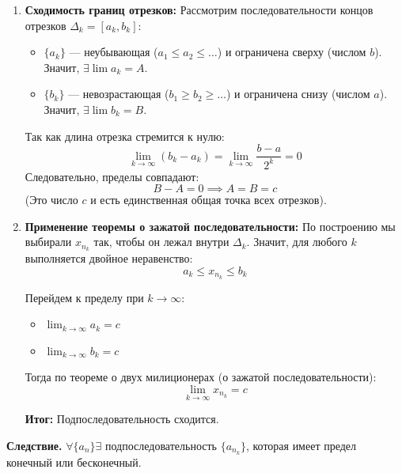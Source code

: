 \begin{tcolorbox}[title=Доказательство (через вложенные отрезки)]
\begin{enumerate}
		\item \textbf{Сходимость границ отрезков:}
		Рассмотрим последовательности концов отрезков $\Delta_k = [a_k, b_k]$:
		\begin{itemize}
			\item $\{a_k\}$ — неубывающая ($a_1 \le a_2 \le \dots$) и ограничена сверху (числом $b$). Значит, $\exists \lim a_k = A$.
			\item $\{b_k\}$ — невозрастающая ($b_1 \ge b_2 \ge \dots$) и ограничена снизу (числом $a$). Значит, $\exists \lim b_k = B$.
		\end{itemize}
		Так как длина отрезка стремится к нулю:
		$$ \lim_{k\to\infty} (b_k - a_k) = \lim_{k\to\infty} \frac{b-a}{2^k} = 0 $$
		Следовательно, пределы совпадают:
		$$ B - A = 0 \implies A = B = c $$
		(Это число $c$ и есть единственная общая точка всех отрезков).

		\item \textbf{Применение теоремы о зажатой последовательности:}
		По построению мы выбирали $x_{n_k}$ так, чтобы он лежал внутри $\Delta_k$. Значит, для любого $k$ выполняется двойное неравенство:
		$$ a_k \le x_{n_k} \le b_k $$
		
		Перейдем к пределу при $k \to \infty$:
		\begin{itemize}
			\item $\lim_{k\to\infty} a_k = c$
			\item $\lim_{k\to\infty} b_k = c$
		\end{itemize}
		
		Тогда по теореме о двух милиционерах (о зажатой последовательности):
		$$ \lim_{k\to\infty} x_{n_k} = c $$
		
		\textbf{Итог:} Подпоследовательность сходится.
	\end{enumerate}
\end{tcolorbox}

\textbf{Следствие.} $\forall \{a_n\} \exists$ подпоследовательность $\{a_{n_k}\}$, которая имеет предел конечный или бесконечный. 

